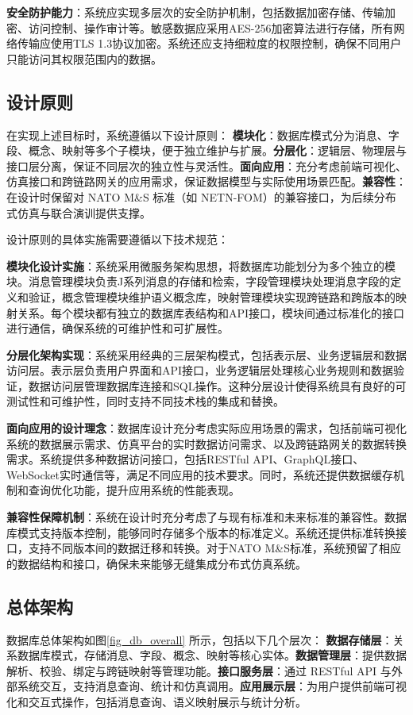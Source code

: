 \textbf{安全防护能力}：系统应实现多层次的安全防护机制，包括数据加密存储、传输加密、访问控制、操作审计等。敏感数据应采用AES-256加密算法进行存储，所有网络传输应使用TLS 1.3协议加密。系统还应支持细粒度的权限控制，确保不同用户只能访问其权限范围内的数据。

\subsection{设计原则}
在实现上述目标时，系统遵循以下设计原则：
\textbf{模块化}：数据库模式分为消息、字段、概念、映射等多个子模块，便于独立维护与扩展。\textbf{分层化}：逻辑层、物理层与接口层分离，保证不同层次的独立性与灵活性。\textbf{面向应用}：充分考虑前端可视化、仿真接口和跨链路网关的应用需求，保证数据模型与实际使用场景匹配。\textbf{兼容性}：在设计时保留对 NATO M\&S 标准（如 NETN-FOM）的兼容接口，为后续分布式仿真与联合演训提供支撑。

设计原则的具体实施需要遵循以下技术规范：

\textbf{模块化设计实施}：系统采用微服务架构思想，将数据库功能划分为多个独立的模块。消息管理模块负责J系列消息的存储和检索，字段管理模块处理消息字段的定义和验证，概念管理模块维护语义概念库，映射管理模块实现跨链路和跨版本的映射关系。每个模块都有独立的数据库表结构和API接口，模块间通过标准化的接口进行通信，确保系统的可维护性和可扩展性。

\textbf{分层化架构实现}：系统采用经典的三层架构模式，包括表示层、业务逻辑层和数据访问层。表示层负责用户界面和API接口，业务逻辑层处理核心业务规则和数据验证，数据访问层管理数据库连接和SQL操作。这种分层设计使得系统具有良好的可测试性和可维护性，同时支持不同技术栈的集成和替换。

\textbf{面向应用的设计理念}：数据库设计充分考虑实际应用场景的需求，包括前端可视化系统的数据展示需求、仿真平台的实时数据访问需求、以及跨链路网关的数据转换需求。系统提供多种数据访问接口，包括RESTful API、GraphQL接口、WebSocket实时通信等，满足不同应用的技术要求。同时，系统还提供数据缓存机制和查询优化功能，提升应用系统的性能表现。

\textbf{兼容性保障机制}：系统在设计时充分考虑了与现有标准和未来标准的兼容性。数据库模式支持版本控制，能够同时存储多个版本的标准定义。系统还提供标准转换接口，支持不同版本间的数据迁移和转换。对于NATO M\&S标准，系统预留了相应的数据结构和接口，确保未来能够无缝集成分布式仿真系统。

\subsection{总体架构}
数据库总体架构如图\ref{fig_db_overall} 所示，包括以下几个层次：
\textbf{数据存储层}：关系数据库模式，存储消息、字段、概念、映射等核心实体。\textbf{数据管理层}：提供数据解析、校验、绑定与跨链映射等管理功能。\textbf{接口服务层}：通过 RESTful API 与外部系统交互，支持消息查询、统计和仿真调用。\textbf{应用展示层}：为用户提供前端可视化和交互式操作，包括消息查询、语义映射展示与统计分析。

